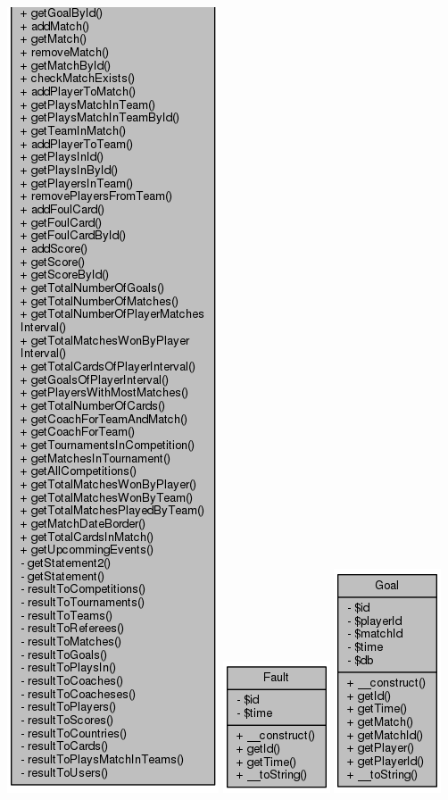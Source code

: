 \documentclass[11pt]{article}
\begin{document}
\includegraphics[scale=0.4]{UML_Database2.png}
\includegraphics[scale=0.4]{UML_Fault.png}
\includegraphics[scale=0.4]{UML_Goal.png}
\end{document}
